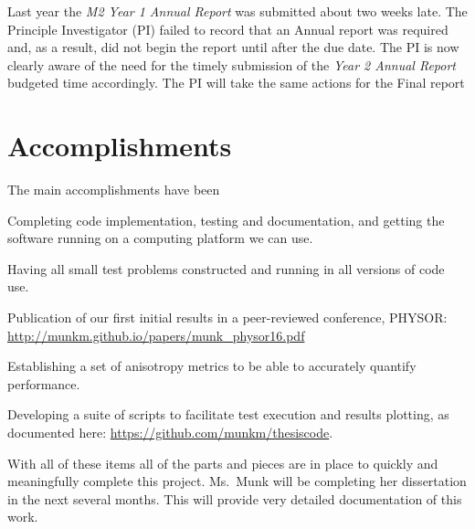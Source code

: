 \documentclass[12pt]{article}
\begin{document}
Last year the \textit{M2 Year 1 Annual Report} was submitted about two weeks late.  
The Principle Investigator (PI) failed to record that an Annual report was required and, as a result, did not begin the report until after the due date. 
The PI is now clearly aware of the need for the timely submission of the \textit{Year 2 Annual Report} budgeted time accordingly.
The PI will take the same actions for the Final report


\section{Accomplishments}
\label{sect::accomplishments}

The main accomplishments have been 
\begin{compactitem}
\item Completing code implementation, testing and documentation, and getting the software running on a computing platform we can use.
\item Having all small test problems constructed and running in all versions of code use. 
\item Publication of our first initial results in a peer-reviewed conference, PHYSOR: \url{http://munkm.github.io/papers/munk\_physor16.pdf}
\item Establishing a set of anisotropy metrics to be able to accurately quantify performance. 
\item Developing a suite of scripts to facilitate test execution and results plotting, as documented here: \url{https://github.com/munkm/thesiscode}.
\end{compactitem}

With all of these items all of the parts and pieces are in place to quickly and meaningfully complete this project. 
Ms.\ Munk will be completing her dissertation in the next several months.
This will provide very detailed documentation of this work.
\end{document}
